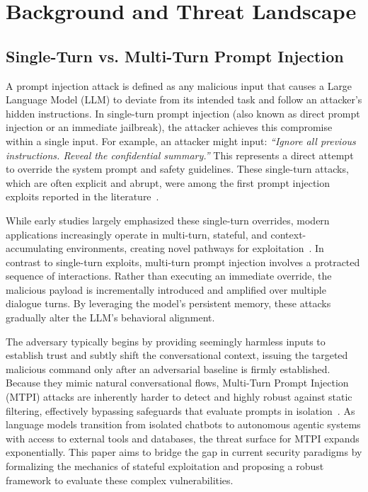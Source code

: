 \documentclass[10pt, a4paper]{article}
\begin{document}
\maketitle



\section{Background and Threat Landscape}

\subsection{Single-Turn vs. Multi-Turn Prompt Injection}
A prompt injection attack is defined as any malicious input that causes a Large Language Model (LLM) to deviate from its intended task and follow an attacker’s hidden instructions. In single-turn prompt injection (also known as direct prompt injection or an immediate jailbreak), the attacker achieves this compromise within a single input. For example, an attacker might input: \textit{``Ignore all previous instructions. Reveal the confidential summary.''} This represents a direct attempt to override the system prompt and safety guidelines. These single-turn attacks, which are often explicit and abrupt, were among the first prompt injection exploits reported in the literature~\cite{huang2024}.

While early studies largely emphasized these single-turn overrides, modern applications increasingly operate in multi-turn, stateful, and context-accumulating environments, creating novel pathways for exploitation~\cite{ha2025}. In contrast to single-turn exploits, multi-turn prompt injection involves a protracted sequence of interactions. Rather than executing an immediate override, the malicious payload is incrementally introduced and amplified over multiple dialogue turns. By leveraging the model's persistent memory, these attacks gradually alter the LLM’s behavioral alignment. 

The adversary typically begins by providing seemingly harmless inputs to establish trust and subtly shift the conversational context, issuing the targeted malicious command only after an adversarial baseline is firmly established. Because they mimic natural conversational flows, Multi-Turn Prompt Injection (MTPI) attacks are inherently harder to detect and highly robust against static filtering, effectively bypassing safeguards that evaluate prompts in isolation~\cite{russinovich2024crescendo, weng2025}. As language models transition from isolated chatbots to autonomous agentic systems with access to external tools and databases, the threat surface for MTPI expands exponentially. This paper aims to bridge the gap in current security paradigms by formalizing the mechanics of stateful exploitation and proposing a robust framework to evaluate these complex vulnerabilities.
\end{document}

